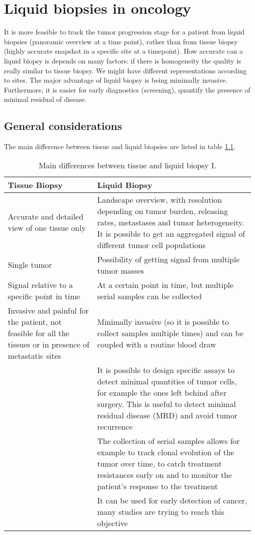\graphicspath{{chapters/LiquidBiopsiesImages/}}

\chapter{Liquid biopsies in oncology}
It is more feasible to track the tumor progression stage for a patient from liquid biopsies (panoramic overview at a time point), rather than from tissue biopsy (highly accurate snapshot in a specific site at a timepoint). How accurate can a liquid biopsy is depends on many factors: if there is homogeneity the quality is really similar to tissue biopsy. We might have different representations according to sites. The major advantage of liquid biopsy is being minimally invasive. Furthermore, it is easier for early diagnostics (screening), quantify the presence of minimal residual of disease.

\section{General considerations}
The main difference between tissue and liquid biopsies are listed in table \ref{tab:diff1}.
\begin{table}[H]
\centering

\begin{tabular}{ | p{4cm} | p{9cm} | }
 \hline
 \textbf{Tissue Biopsy} & \textbf{Liquid Biopsy} \\
 \hline
 \hline
 Accurate and detailed view of one tissue only & Landscape overview, with resolution depending on tumor burden, releasing rates, metastases and tumor heterogeneity. It is possible to get an aggregated signal of different tumor cell populations \\
 \hline
 Single tumor & Possibility of getting signal from multiple tumor masses \\
 \hline
 Signal relative to a specific point in time & At a certain point in time, but multiple serial samples can be collected \\
 \hline
 Invasive and painful for the patient, not feasible for all the tissues or in presence of metastatic sites & Minimally invasive (so it is possible to collect samples multiple times) and can be coupled with a routine blood draw \\
 \hline
 & It is possible to design specific assays to detect minimal quantities of tumor cells, for example the ones left behind after surgery. This is useful to detect minimal residual disease (MRD) and avoid tumor recurrence \\
 \hline
 & The collection of serial samples allows for example to track clonal evolution of the tumor over time, to catch treatment resistances early on and to monitor the patient's response to the treatment \\
 \hline
 & It can be used for early detection of cancer, many studies are trying to reach this objective \\
 \hline
\end{tabular}
\caption{Main differences between tissue and liquid biopsy I.}
\label{tab:diff1}
\end{table}


